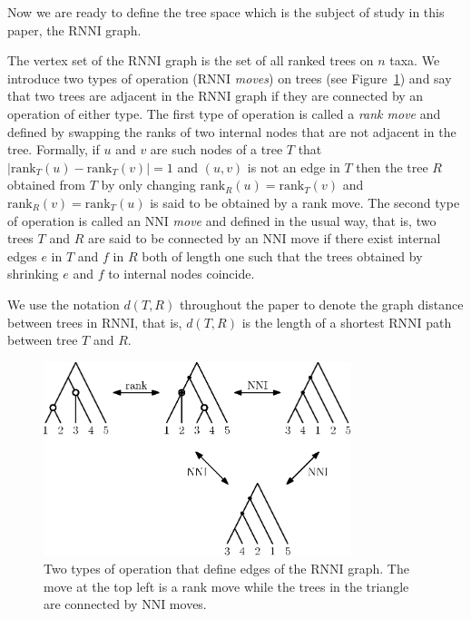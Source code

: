 \documentclass{amsart}
\newcommand{\rank}{\mathrm{rank}}
\newcommand{\nni}{\mathrm{NNI}}
\newcommand{\rnni}{\mathrm{RNNI}}
\begin{document}
Now we are ready to define the tree space which is the subject of study in this paper, the $\rnni$ graph.

The vertex set of the $\rnni$ graph is the set of all ranked trees on $n$ taxa.
We introduce two types of operation ($\rnni$ \emph{moves}) on trees (see Figure~\ref{fig:RNNI}) and say that two trees are adjacent in the $\rnni$ graph if they are connected by an operation of either type.
The first type of operation is called a \emph{rank move} and defined by swapping the ranks of two internal nodes that are not adjacent in the tree.
Formally, if $u$ and $v$ are such nodes of a tree $T$ that $|\rank_T(u) - \rank_T(v)| = 1$ and $(u, v)$ is not an edge in $T$ then the tree $R$ obtained from $T$ by only changing $\rank_R(u) = \rank_T(v)$ and $\rank_R(v) = \rank_T(u)$ is said to be obtained by a rank move.
The second type of operation is called an $\nni$ \emph{move} and defined in the usual way, that is, two trees $T$ and $R$ are said to be connected by an $\nni$ move if there exist internal edges $e$ in $T$ and $f$ in $R$ both of length one such that the trees obtained by shrinking $e$ and $f$ to internal nodes coincide.

We use the notation $d(T, R)$ throughout the paper to denote the graph distance between trees in $\rnni$, that is, $d(T, R)$ is the length of a shortest $\rnni$ path between tree $T$ and $R$.

\begin{figure}[H]
	\centering
	\includegraphics[width=0.8\textwidth]{RNNI}
    \vspace{12pt}
	\caption{Two types of operation that define edges of the $\rnni$ graph.
    The move at the top left is a rank move while the trees in the triangle are connected by $\nni$ moves.}
	\label{fig:RNNI}
\end{figure}

\end{document}
